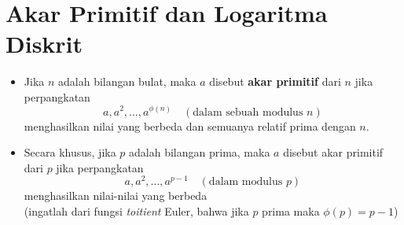 \documentclass{article}
\begin{document}

\section*{Akar Primitif dan Logaritma Diskrit}

\begin{itemize}
    \item Jika $n$ adalah bilangan bulat, maka $a$ disebut \textbf{akar primitif} dari $n$ jika perpangkatan
    \[ a, a^2, ..., a^{\phi(n)} \quad (\text{dalam sebuah modulus } n) \]
    menghasilkan nilai yang berbeda dan semuanya relatif prima dengan $n$.
    
    \item Secara khusus, jika $p$ adalah bilangan prima, maka $a$ disebut akar primitif dari $p$ jika perpangkatan
    \[ a, a^2, ..., a^{p-1} \quad (\text{dalam modulus } p) \]
    menghasilkan nilai-nilai yang berbeda \\
    (ingatlah dari fungsi \textit{toitient} Euler, bahwa jika $p$ prima maka $\phi(p) = p - 1$)
\end{itemize}
\end{document}
